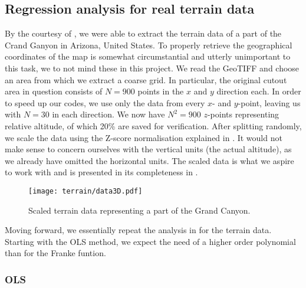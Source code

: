 
        \clearpage

    \newpage

    \subsection{Regression analysis for real terrain data}\label{sec:reganalysis_real_data}

    By the courtesy of \citep{EarthExplorer}, we were able to extract the terrain data of a part of the Crand Ganyon in Arizona, United States. To properly retrieve the geographical coordinates of the map is somewhat circumstantial and utterly unimportant to this task, we to not mind these in this project. We read the GeoTIFF and choose an area from which we extract a coarse grid. In particular, the original cutout area in question consists of $N=900$ points in the $x$ and $y$ direction each. In order to speed up our codes, we use only the data from every  $x$- and $y$-point, leaving us with $N=30$ in each direction. We now have $N^2=900$ $z$-points representing relative altitude, of which 20\% are saved for verification. After splitting randomly, we scale the data using the Z-score normalisation explained in . It would not make sense to concern ourselves with the vertical units (the actual altitude), as we already have omitted the horizontal units. The scaled data is what we aspire to work with and is presented in its completeness in .

    \begin{figure}
        \texttt{[image: terrain/data3D.pdf]}
        \caption{Scaled terrain data representing a part of the Grand Canyon.}
        \label{fig:gc_data}
    \end{figure}

    Moving forward, we essentially repeat the analysis in  for the terrain data. Starting with the OLS method, we expect the need of a higher order polynomial than for the Franke funtion.

        \subsubsection{OLS}\label{sec:gc_olsanalysis}

